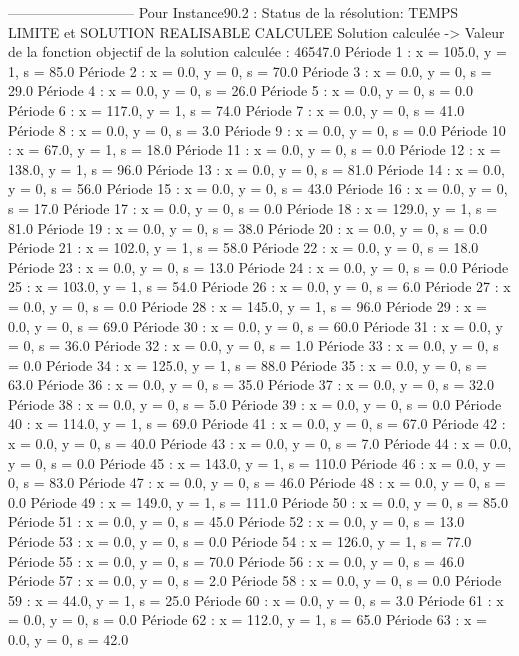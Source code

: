 ---------------------------
Pour Instance90.2  :
Status de la résolution: TEMPS LIMITE et SOLUTION REALISABLE CALCULEE
Solution calculée
-> Valeur de la fonction objectif de la solution calculée :  46547.0
Période 1 : x = 105.0, y = 1, s = 85.0
Période 2 : x = 0.0, y = 0, s = 70.0
Période 3 : x = 0.0, y = 0, s = 29.0
Période 4 : x = 0.0, y = 0, s = 26.0
Période 5 : x = 0.0, y = 0, s = 0.0
Période 6 : x = 117.0, y = 1, s = 74.0
Période 7 : x = 0.0, y = 0, s = 41.0
Période 8 : x = 0.0, y = 0, s = 3.0
Période 9 : x = 0.0, y = 0, s = 0.0
Période 10 : x = 67.0, y = 1, s = 18.0
Période 11 : x = 0.0, y = 0, s = 0.0
Période 12 : x = 138.0, y = 1, s = 96.0
Période 13 : x = 0.0, y = 0, s = 81.0
Période 14 : x = 0.0, y = 0, s = 56.0
Période 15 : x = 0.0, y = 0, s = 43.0
Période 16 : x = 0.0, y = 0, s = 17.0
Période 17 : x = 0.0, y = 0, s = 0.0
Période 18 : x = 129.0, y = 1, s = 81.0
Période 19 : x = 0.0, y = 0, s = 38.0
Période 20 : x = 0.0, y = 0, s = 0.0
Période 21 : x = 102.0, y = 1, s = 58.0
Période 22 : x = 0.0, y = 0, s = 18.0
Période 23 : x = 0.0, y = 0, s = 13.0
Période 24 : x = 0.0, y = 0, s = 0.0
Période 25 : x = 103.0, y = 1, s = 54.0
Période 26 : x = 0.0, y = 0, s = 6.0
Période 27 : x = 0.0, y = 0, s = 0.0
Période 28 : x = 145.0, y = 1, s = 96.0
Période 29 : x = 0.0, y = 0, s = 69.0
Période 30 : x = 0.0, y = 0, s = 60.0
Période 31 : x = 0.0, y = 0, s = 36.0
Période 32 : x = 0.0, y = 0, s = 1.0
Période 33 : x = 0.0, y = 0, s = 0.0
Période 34 : x = 125.0, y = 1, s = 88.0
Période 35 : x = 0.0, y = 0, s = 63.0
Période 36 : x = 0.0, y = 0, s = 35.0
Période 37 : x = 0.0, y = 0, s = 32.0
Période 38 : x = 0.0, y = 0, s = 5.0
Période 39 : x = 0.0, y = 0, s = 0.0
Période 40 : x = 114.0, y = 1, s = 69.0
Période 41 : x = 0.0, y = 0, s = 67.0
Période 42 : x = 0.0, y = 0, s = 40.0
Période 43 : x = 0.0, y = 0, s = 7.0
Période 44 : x = 0.0, y = 0, s = 0.0
Période 45 : x = 143.0, y = 1, s = 110.0
Période 46 : x = 0.0, y = 0, s = 83.0
Période 47 : x = 0.0, y = 0, s = 46.0
Période 48 : x = 0.0, y = 0, s = 0.0
Période 49 : x = 149.0, y = 1, s = 111.0
Période 50 : x = 0.0, y = 0, s = 85.0
Période 51 : x = 0.0, y = 0, s = 45.0
Période 52 : x = 0.0, y = 0, s = 13.0
Période 53 : x = 0.0, y = 0, s = 0.0
Période 54 : x = 126.0, y = 1, s = 77.0
Période 55 : x = 0.0, y = 0, s = 70.0
Période 56 : x = 0.0, y = 0, s = 46.0
Période 57 : x = 0.0, y = 0, s = 2.0
Période 58 : x = 0.0, y = 0, s = 0.0
Période 59 : x = 44.0, y = 1, s = 25.0
Période 60 : x = 0.0, y = 0, s = 3.0
Période 61 : x = 0.0, y = 0, s = 0.0
Période 62 : x = 112.0, y = 1, s = 65.0
Période 63 : x = 0.0, y = 0, s = 42.0
